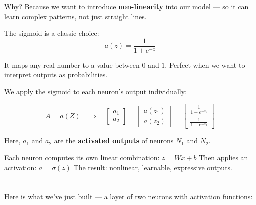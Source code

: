 \documentclass[11pt]{article}
\begin{document}
\vspace{0.5em}

Why?  
Because we want to introduce \textbf{non-linearity} into our model —  
so it can learn complex patterns, not just straight lines.

\vspace{1em}

\begin{tcolorbox}[colback=blue!5, colframe=blue!80!black, title=Sigmoid Activation Function]
The sigmoid is a classic choice:
\[
a(z) = \frac{1}{1 + e^{-z}}
\]

It maps any real number to a value between $0$ and $1$.  
Perfect when we want to interpret outputs as probabilities.
\end{tcolorbox}

\vspace{1.5em}

We apply the sigmoid to each neuron's output individually:

\[
A = a(Z)
\quad \Rightarrow \quad
\begin{bmatrix}
a_1 \\
a_2
\end{bmatrix}
=
\begin{bmatrix}
a(z_1) \\
a(z_2)
\end{bmatrix}
=
\begin{bmatrix}
\frac{1}{1 + e^{-z_1}} \\
\frac{1}{1 + e^{-z_2}}
\end{bmatrix}
\]

Here, $a_1$ and $a_2$ are the \textbf{activated outputs} of neurons $N_1$ and $N_2$.

\vspace{1.5em}

\begin{tcolorbox}[colback=green!5, colframe=green!60!black, title=Key Insight]
Each neuron computes its own linear combination: $z = Wx + b$  
Then applies an activation: $a = \sigma(z)$  
The result: nonlinear, learnable, expressive outputs.
\end{tcolorbox}

\vspace{2em}

\section*{}

Here is what we’ve just built — a layer of two neurons with activation functions:
\end{document}

